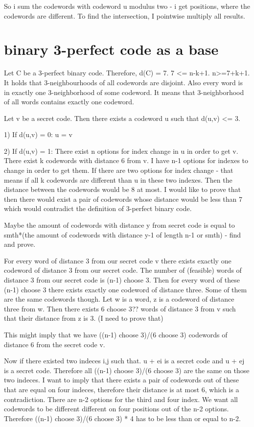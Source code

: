 So i sum the codewords with codeword u modulus two - i get positions, where the codewords are different. To find the intersection, I pointwise multiply all results.

\section{binary 3-perfect code as a base}
Let C be a 3-perfect binary code. Therefore, d(C) = 7. 7 <= n-k+1. n>=7+k+1. It holds that 3-neighbourhoods of all codewords are disjoint. Also every word is in exactly one 3-neighborhood of some codeword. It means that 3-neighborhood of all words contains exactly one codeword. 

Let v be a secret code. Then there exists a codeword u such that d(u,v) <= 3.

1) If d(u,v) = 0: u = v

2) If d(u,v) = 1: 
There exist n options for index change in u in order to get v. There exist k codewords with distance 6 from v. I have n-1 options for indexes to change in order to get them. 
If there are two options for index change - that means if all k codewords are different than u in these two indexes. Then the distance between the codewords would be 8 at most. I would like to prove that then there would exist a pair of codewords whose distance would be less than 7 which would contradict the definition of 3-perfect binary code.

Maybe the amount of codewords with distance y from secret code is equal to smth*(the amount of codewords with distance y-1 of length n-1 or smth) - find and prove. 

For every word of distance 3 from our secret code v there exists exactly one codeword of distance 3 from our secret code. The number of (feasible) words of distance 3 from our secret code is (n-1) choose 3. Then for every word of these (n-1) choose 3 there exists exactly one codeword of distance three. Some of them are the same codewords though. Let w is a word, z is a codeword of distance three from w. Then there exists 6 choose 3?? words of distance 3 from v such that their distance from z is 3. (I need to prove that)

This might imply that we have ((n-1) choose 3)/(6 choose 3) codewords of distance 6 from the secret code v. 

Now if there existed two indeces i,j such that. u + ei is a secret code and u + ej is a secret code. Therefore all ((n-1) choose 3)/(6 choose 3) are the same on those two indeces. I want to imply that there exists a pair of codewords out of these that are equal on four indeces, therefore their distance is at most 6, which is a contradiction. There are n-2 options for the third and four index. We want all codewords to be different different on four positions out of the n-2 options. Therefore ((n-1) choose 3)/(6 choose 3) * 4 has to be less than or equal to n-2. 

